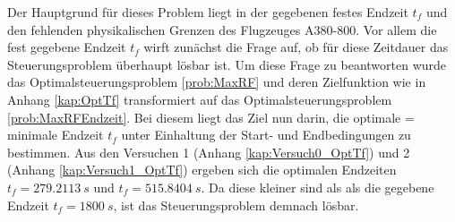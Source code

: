 Der Hauptgrund für dieses Problem liegt in der gegebenen festes Endzeit $t_f$ und den fehlenden physikalischen Grenzen des Flugzeuges A380-800. Vor allem die fest gegebene Endzeit $t_f$ wirft zunächst die Frage auf, ob für diese Zeitdauer das Steuerungsproblem überhaupt lösbar ist. Um diese Frage zu beantworten wurde das Optimalsteuerungsproblem \ref{prob:MaxRF} und deren Zielfunktion wie in Anhang \ref{kap:OptTf} transformiert auf das Optimalsteuerungsproblem \ref{prob:MaxRFEndzeit}. Bei diesem liegt das Ziel nun darin, die optimale = minimale Endzeit $t_f$ unter Einhaltung der Start- und Endbedingungen zu bestimmen. Aus den Versuchen 1 (Anhang \ref{kap:Versuch0_OptTf}) und 2 (Anhang \ref{kap:Versuch1_OptTf}) ergeben sich die optimalen Endzeiten $t_f = 279.2113 \ s$ und $t_f = 515.8404 \ s$. Da diese kleiner sind als als die gegebene Endzeit $t_f = 1800 \ s$, ist das Steuerungsproblem demnach lösbar.

